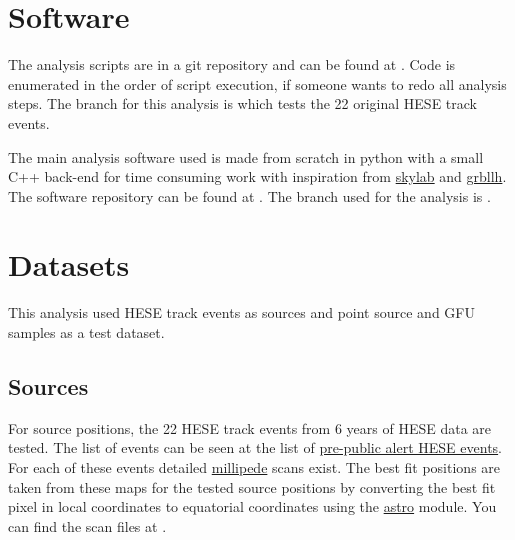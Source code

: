 \section{Software}
The analysis scripts are in a git repository and can be found at .
Code is enumerated in the order of script execution, if someone wants to redo all analysis steps.
The branch for this analysis is  which tests the 22 original HESE track events.

The main analysis software used is made from scratch in python with a small C++ back-end for time consuming work with inspiration from \href{http://code.icecube.wisc.edu/projects/icecube/browser/IceCube/sandbox/skylab}{skylab} and \href{http://code.icecube.wisc.edu/projects/icecube/browser/IceCube/sandbox/richman/grbllh}{grbllh}.
The software repository can be found at .
The branch used for the analysis is .



\section{Datasets}
This analysis used HESE track events as sources and point source and GFU samples as a test dataset.

\subsection{Sources}
For source positions, the 22 HESE track events from 6 years of HESE data are tested.
The list of events can be seen at the list of \href{https://wiki.icecube.wisc.edu/index.php/Analysis_of_pre-public_alert_HESE/EHE_events#HESE }{pre-public alert HESE events}.
For each of these events detailed \href{http://software.icecube.wisc.edu/documentation/projects/millipede/index.html}{millipede} scans exist.
The best fit positions are taken from these maps for the tested source positions by converting the best fit pixel in local coordinates to equatorial coordinates using the \href{http://software.icecube.wisc.edu/documentation/projects/astro/index.html}{astro} module.
You can find the scan files at .

